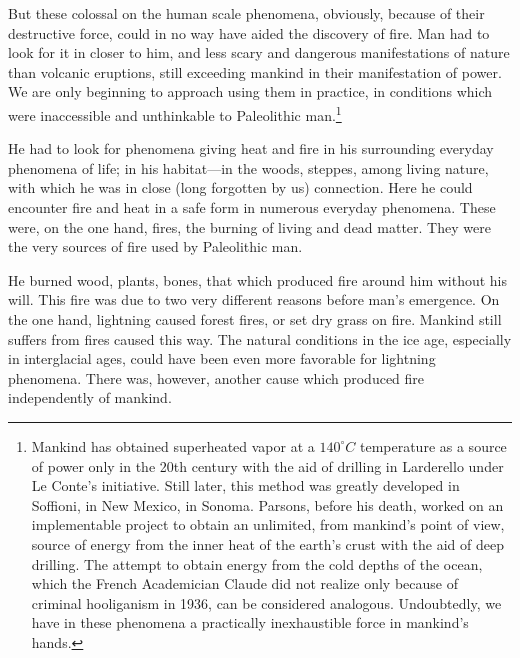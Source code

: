 But these colossal on the human scale phenomena, obviously, because of their
destructive force, could in no way have aided the discovery of fire.  Man had
to look for it in closer to him, and less scary and dangerous manifestations
of nature than volcanic eruptions, still exceeding mankind in their
manifestation of power.  We are only beginning to approach using them in
practice, in conditions which were inaccessible and unthinkable to Paleolithic
man.\footnote{
	Mankind has obtained superheated vapor at a ${140}^\circ C$ temperature
	as a source of power only in the 20th century with the aid of drilling
	in Larderello under Le Conte's initiative.  Still later, this method
	was greatly developed in Soffioni, in New Mexico, in Sonoma.  Parsons,
	before his death, worked on an implementable project to obtain an
	unlimited, from mankind's point of view, source of energy from the
	inner heat of the earth's crust with the aid of deep drilling.  The
	attempt to obtain energy from the cold depths of the ocean, which the
	French Academician Claude did not realize only because of criminal
	hooliganism in 1936, can be considered analogous.  Undoubtedly, we have
	in these phenomena a practically inexhaustible force in mankind's
	hands.}

He had to look for phenomena giving heat and fire in his surrounding everyday
phenomena of life; in his habitat---in the woods, steppes, among living
nature, with which he was in close (long forgotten by us) connection.  Here he
could encounter fire and heat in a safe form in numerous everyday phenomena.
These were, on the one hand, fires, the burning of living and dead matter.
They were the very sources of fire used by Paleolithic man.

He burned wood, plants, bones, that which produced fire around him without his
will.  This fire was due to two very different reasons before man's emergence.
On the one hand, lightning caused forest fires, or set dry grass on fire.
Mankind still suffers from fires caused this way.  The natural conditions in
the ice age, especially in interglacial ages, could have been even more
favorable for lightning phenomena.  There was, however, another cause which
produced fire independently of mankind.

